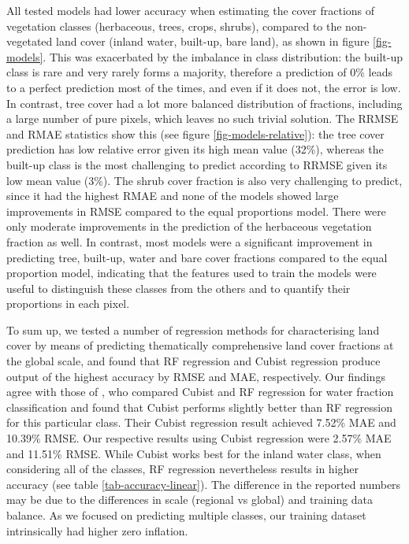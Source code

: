 \documentclass[review,authoryear,3p]{elsarticle}
\begin{document}
All tested models had lower accuracy when estimating the cover fractions of vegetation classes (herbaceous, trees, crops, shrubs), compared to the non-vegetated land cover (inland water, built-up, bare land), as shown in figure \ref{fig-models}.
This was exacerbated by the imbalance in class distribution: the built-up class is rare and very rarely forms a majority, therefore a prediction of 0\% leads to a perfect prediction most of the times, and even if it does not, the error is low.
In contrast, tree cover had a lot more balanced distribution of fractions, including a large number of pure pixels, which leaves no such trivial solution.
The \gls{RRMSE} and \gls{RMAE} statistics show this (see figure \ref{fig-models-relative}): the tree cover prediction has low relative error given its high mean value (32\%), whereas the built-up class is the most challenging to predict according to \gls{RRMSE} given its low mean value (3\%).
The shrub cover fraction is also very challenging to predict, since it had the highest \gls{RMAE} and none of the models showed large improvements in \gls{RMSE} compared to the equal proportions model.
There were only moderate improvements in the prediction of the herbaceous vegetation fraction as well.
In contrast, most models were a significant improvement in predicting tree, built-up, water and bare cover fractions compared to the equal proportion model, indicating that the features used to train the models were useful to distinguish these classes from the others and to quantify their proportions in each pixel.

To sum up, we tested a number of regression methods for characterising land cover by means of predicting thematically comprehensive land cover fractions at the global scale, and found that \gls{RF} regression and Cubist regression produce output of the highest accuracy by \gls{RMSE} and \gls{MAE}, respectively.
Our findings agree with those of \citet{li_monitoring_2018}, who compared Cubist and \gls{RF} regression for water fraction classification and found that Cubist performs slightly better than \gls{RF} regression for this particular class.
Their Cubist regression result achieved 7.52\% \gls{MAE} and 10.39\% \gls{RMSE}.
Our respective results using Cubist regression were 2.57\% \gls{MAE} and 11.51\% \gls{RMSE}.
While Cubist works best for the inland water class, when considering all of the classes, \gls{RF} regression nevertheless results in higher accuracy (see table \ref{tab-accuracy-linear}).
The difference in the reported numbers may be due to the differences in scale (regional vs global) and training data balance.
As we focused on predicting multiple classes, our training dataset intrinsically had higher zero inflation.
\end{document}
